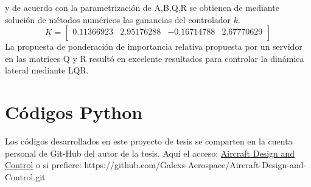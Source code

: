 y de acuerdo con la parametrización de A,B,Q,R se obtienen de mediante solución de métodos numéricos las ganancias del controlador $k$.
\begin{equation}
    K
    =
    \begin{bmatrix}
     0.11366923 &  2.95176288 & -0.16714788 &   2.67770629\\
    \end{bmatrix}
\end{equation}
La propuesta de ponderación de importancia relativa propuesta por un servidor en las matrices Q y R resultó en excelente resultados para controlar la dinámica lateral mediante LQR. 

\section{Códigos Python}
\label{a codigos python}
Los códigos desarrollados en este proyecto de tesis se comparten en la cuenta personal de Git-Hub del autor de la tesis. Aquí el acceso: 
\href{https://github.com/Galexs-Aerospace/Aircraft-Design-and-Control.git}{Aircraft Design and Control} o si prefiere: https://github.com/Galexs-Aerospace/Aircraft-Design-and-Control.git


